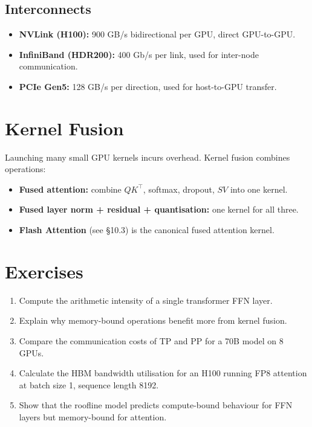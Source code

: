\documentclass[11pt,a4paper]{book}
\theoremstyle{definition}
\begin{document}
\subsection{Interconnects}

\begin{itemize}
	\item \textbf{NVLink (H100):} 900 GB/s bidirectional per GPU, direct GPU-to-GPU.
	\item \textbf{InfiniBand (HDR200):} 400 Gb/s per link, used for inter-node communication.
	\item \textbf{PCIe Gen5:} 128 GB/s per direction, used for host-to-GPU transfer.
\end{itemize}

\section{Kernel Fusion}

Launching many small GPU kernels incurs overhead. Kernel fusion combines operations:
\begin{itemize}
	\item \textbf{Fused attention:} combine $QK^\top$, softmax, dropout, $SV$ into one kernel.
	\item \textbf{Fused layer norm + residual + quantisation:} one kernel for all three.
	\item \textbf{Flash Attention} (see \S10.3) is the canonical fused attention kernel.
\end{itemize}

\section{Exercises}

\begin{enumerate}
	\item Compute the arithmetic intensity of a single transformer FFN layer.
	\item Explain why memory-bound operations benefit more from kernel fusion.
	\item Compare the communication costs of TP and PP for a 70B model on 8 GPUs.
	\item Calculate the HBM bandwidth utilisation for an H100 running FP8 attention at batch size 1, sequence length 8192.
	\item Show that the roofline model predicts compute-bound behaviour for FFN layers but memory-bound for attention.
\end{enumerate}
\end{document}
